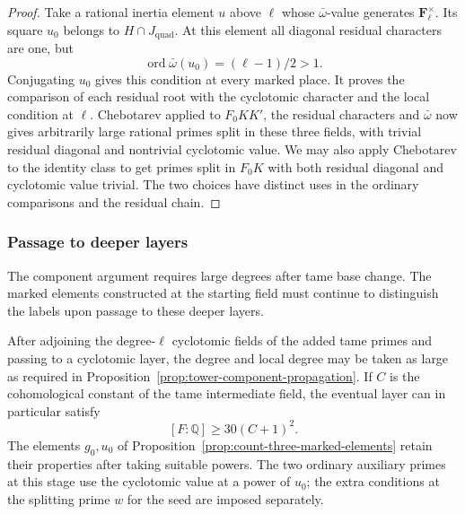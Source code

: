 \begin{proof}
Take a rational inertia element \(u\) above \(\ell\)
whose \(\bar\omega\)-value generates \(\mathbf F_\ell^\times\).
Its square \(u_0\) belongs to \(H\cap J_{\mathrm{quad}}\).
At this element all diagonal residual characters are one, but
\[
                \operatorname{ord}\bar\omega(u_0)=(\ell-1)/2>1.
\]
Conjugating \(u_0\) gives this condition at
every marked place. It proves the comparison of each
residual root with the cyclotomic character and the
local condition at \(\ell\).
Chebotarev applied to \(F_0KK'\), the residual characters
and \(\bar\omega\) now gives arbitrarily large rational
primes split in these three fields, with trivial residual
diagonal and nontrivial cyclotomic value. We may also
apply Chebotarev to the identity class to get primes
split in \(F_0K\) with both residual diagonal and
cyclotomic value trivial. The two choices have distinct
uses in the ordinary comparisons and the residual chain.

\end{proof}

\subsubsection{Passage to deeper layers}

The component argument requires large degrees after tame base change. The marked elements constructed at the starting field must continue to distinguish the labels upon passage to these deeper layers.

\begin{proposition}\label{prop:count-three-fitted-layers}
After adjoining the degree-\(\ell\) cyclotomic fields of the
added tame primes and passing to a cyclotomic layer, the degree
and local degree may be taken as large as required in
Proposition~\ref{prop:tower-component-propagation}. If \(C\) is the cohomological constant of the tame intermediate field, the eventual layer can in particular satisfy 
\[
 [F:\mathbb Q]\ge30(C+1)^2.
\]
 The elements \(g_0,u_0\) of Proposition~\ref{prop:count-three-marked-elements} retain their properties after taking suitable powers. The two ordinary
auxiliary primes at this stage use the cyclotomic value at a power of \(u_0\);
the extra conditions at the splitting prime \(w\) for the seed
are imposed separately.
\end{proposition}


